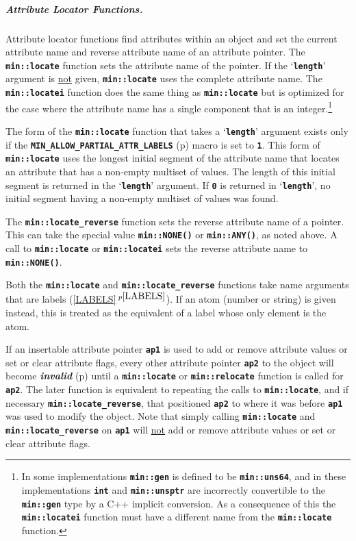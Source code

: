 \documentclass[12pt]{article}
\newcommand{\subsubsubsubsection}[1]{\subparagraph[#1]{#1.}}
\newcommand{\TT}[1]{{\tt \bfseries #1}}
\newcommand{\mkey}[2]{{\bf \em #1}\index{#1!#2}}
\newcommand{\itemref}[1]{\ref{#1}$\,^{p\pageref{#1}}$}
\newcommand{\pagref}[1]{p\pageref{#1}}
\newcommand{\EOL}{\penalty \exhyphenpenalty}
\begin{document}
\subsubsubsubsection{Attribute Locator Functions}
\label{ATTRIBUTE-LOCATOR-FUNCTIONS}

Attribute locator functions
find attributes within an object and set the current
attribute name and reverse attribute name of an attribute pointer.
The \TT{min::\EOL locate} function sets the attribute name of the pointer.
If the `\TT{length}' argument is \underline{not} given, \TT{min::\EOL locate}
uses the complete attribute name.
The \TT{min::\EOL locatei} function does the
same thing as \TT{min::\EOL locate}
but is optimized for the case where the attribute
name has a single component that is an integer.\footnote{
In some implementations \TT{min::gen} is defined to be \TT{min::uns64},
and in these implementations \TT{int} and \TT{min::unsptr} are
incorrectly convertible to the
\TT{min::gen} type by a C++ implicit conversion.  As a consequence of this
the \TT{min::\EOL locatei} function must have a different name from the
\TT{min::\EOL locate} function.}

The form of the \TT{min::\EOL locate} function that takes a `\TT{length}'
argument exists only if the
\TT{MIN\_\EOL ALLOW\_\EOL PARTIAL\_\EOL ATTR\_\EOL LABELS}
(\pagref{MIN_ALLOW_PARTIAL_ATTR_LABELS}) macro is set to \TT{1}.
This form of \TT{min::\EOL locate} uses the longest initial segment of the
attribute name that locates an attribute that has a non-empty
multiset of values.  The
length of this initial segment is returned in the `\TT{length}'
argument.  If \TT{0} is returned in `\TT{length}',
no initial segment having a non-empty multiset of values was found.

The \TT{min::\EOL locate\_reverse} function sets the reverse attribute name of
a pointer.  This can take the special value \TT{min::NONE()} or
\TT{min::ANY()}, as noted above.  A call to \TT{min::\EOL locate} or
\TT{min::\EOL locatei} sets the
reverse attribute name to \TT{min::NONE()}.

Both the \TT{min::\EOL locate} and \TT{min::\EOL locate\_reverse}
functions take name
arguments that are labels (\itemref{LABELS}).  If an atom (number or
string) is given instead, this is treated as the equivalent of
a label whose only element is the atom.

If an insertable attribute pointer \TT{ap1} is used
to add or remove attribute values or set or clear attribute flags,
every other attribute pointer \TT{ap2}
to the object will become \mkey{invalid}{attribute pointer}
(\pagref{INSERTABLE-ATTRIBUTE-FUNCTIONS})
until a \TT{min::\EOL locate} or
\TT{min::\EOL relocate} function is called for \TT{ap2}.  The later
function is equivalent to repeating the calls to \TT{min::\EOL locate},
and if necessary \TT{min::\EOL locate\_\EOL reverse}, that positioned
\TT{ap2} to where it was before \TT{ap1} was used to modify the object.
Note that simply calling \TT{min::\EOL locate}
and \TT{min::\EOL locate\_\EOL reverse} on \TT{ap1} will
\underline{not} add or remove attribute values or set or clear attribute flags.
\end{document}
